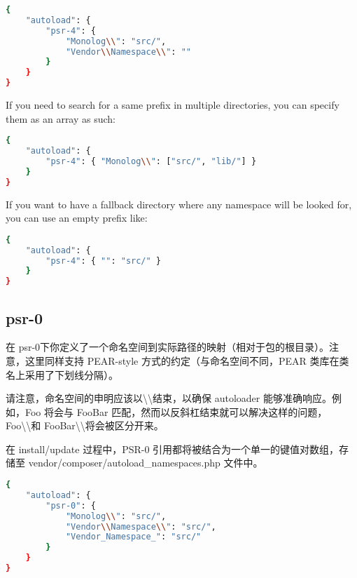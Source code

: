 \begin{lstlisting}[language=bash]
{
    "autoload": {
        "psr-4": {
            "Monolog\\": "src/",
            "Vendor\\Namespace\\": ""
        }
    }
}
\end{lstlisting}

If you need to search for a same prefix in multiple directories, you can specify them as an array as such:


\begin{lstlisting}[language=bash]
{
    "autoload": {
        "psr-4": { "Monolog\\": ["src/", "lib/"] }
    }
}
\end{lstlisting}

If you want to have a fallback directory where any namespace will be looked for, you can use an empty prefix like:


\begin{lstlisting}[language=bash]
{
    "autoload": {
        "psr-4": { "": "src/" }
    }
}
\end{lstlisting}


\subsection{psr-0}

在 psr-0下你定义了一个命名空间到实际路径的映射（相对于包的根目录）。注意，这里同样支持 PEAR-style 方式的约定（与命名空间不同，PEAR 类库在类名上采用了下划线分隔）。

请注意，命名空间的申明应该以\textbackslash \textbackslash  结束，以确保 autoloader 能够准确响应。例如，Foo 将会与 FooBar 匹配，然而以反斜杠结束就可以解决这样的问题， Foo\textbackslash \textbackslash 和 FooBar\textbackslash \textbackslash 将会被区分开来。

在 install/update 过程中，PSR-0 引用都将被结合为一个单一的键值对数组，存储至 vendor/composer/autoload\_namespaces.php 文件中。


\begin{lstlisting}[language=bash]
{
    "autoload": {
        "psr-0": {
            "Monolog\\": "src/",
            "Vendor\\Namespace\\": "src/",
            "Vendor_Namespace_": "src/"
        }
    }
}
\end{lstlisting}



